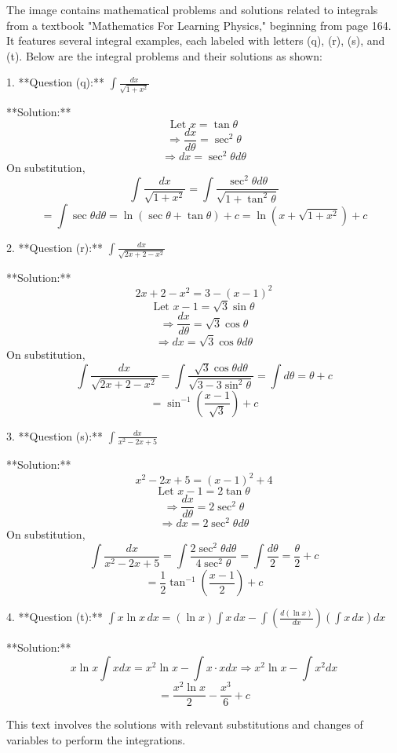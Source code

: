 The image contains mathematical problems and solutions related to integrals from a textbook "Mathematics For Learning Physics," beginning from page 164. It features several integral examples, each labeled with letters (q), (r), (s), and (t). Below are the integral problems and their solutions as shown:

1. **Question (q):**
   \(\int \frac{dx}{\sqrt{1+x^2}}\)

    **Solution:**
    \[
    \text{Let } x = \tan{\theta}
    \]
    \[
    \Rightarrow \frac{dx}{d\theta} = \sec^2{\theta}
    \]
    \[
    \Rightarrow dx = \sec^2{\theta} d\theta
    \]
    On substitution,
    \[
    \int \frac{dx}{\sqrt{1+x^2}} = \int \frac{\sec^2{\theta} d\theta}{\sqrt{1+\tan^2{\theta}}}
    \]
    \[
    = \int \sec{\theta} d\theta = \ln(\sec{\theta} + \tan{\theta}) + c = \ln(x + \sqrt{1+x^2}) + c
    \]

2. **Question (r):**
   \(\int \frac{dx}{\sqrt{2x+2-x^2}}\)

    **Solution:**
    \[
    2x + 2 - x^2 =3 - (x-1)^2
    \]
    \[
    \text{Let } x - 1 = \sqrt{3} \sin{\theta}
    \]
    \[
    \Rightarrow \frac{dx}{d\theta} = \sqrt{3} \cos{\theta}
    \]
    \[
    \Rightarrow dx = \sqrt{3} \cos{\theta} d\theta
    \]
    On substitution,
    \[
    \int \frac{dx}{\sqrt{2x+2-x^2}} = \int \frac{\sqrt{3} \cos{\theta} d\theta}{\sqrt{3 - 3\sin^2{\theta}}} = \int d\theta = \theta + c
    \]
    \[
    = \sin^{-1}(\frac{x-1}{\sqrt{3}}) + c
    \]

3. **Question (s):**
   \(\int \frac{dx}{x^2 - 2x + 5}\)

    **Solution:**
    \[
    x^2 - 2x + 5 = (x - 1)^2 + 4
    \]
    \[
    \text{Let } x - 1 = 2 \tan{\theta}
    \]
    \[
    \Rightarrow \frac{dx}{d\theta} = 2 \sec^2{\theta}
    \]
    \[
    \Rightarrow dx = 2 \sec^2{\theta} d\theta
    \]
    On substitution,
    \[
    \int \frac{dx}{x^2 - 2x + 5} = \int \frac{2 \sec^2{\theta} d\theta}{4 \sec^2{\theta}} = \int \frac{d\theta}{2} = \frac{\theta}{2} + c
    \]
    \[
    = \frac{1}{2} \tan^{-1}(\frac{x-1}{2}) + c
    \]

4. **Question (t):**
   \(\int x \ln x \, dx = ( \ln x) \int x \, dx - \int \left( \frac{d (\ln x)}{dx} \right) \left( \int x \, dx \right) dx\)

    **Solution:**
    \[
    x \ln x \int x dx = x^2 \ln x - \int x \cdot x dx \Rightarrow x^2 \ln x - \int x^2 dx
    \]
    \[
    = \frac{x^2 \ln x}{2} - \frac{x^3}{6} + c
    \]

This text involves the solutions with relevant substitutions and changes of variables to perform the integrations.